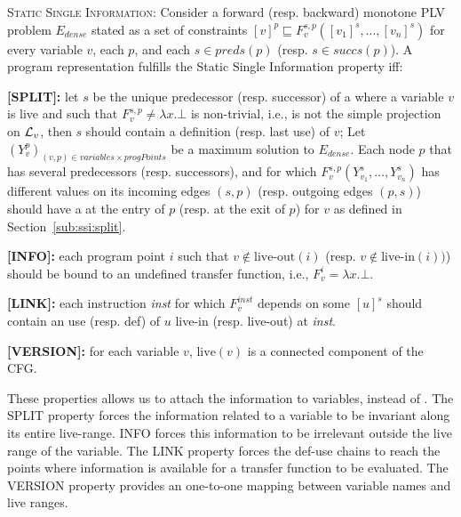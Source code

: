 \begin{property}[SSI]
\label{pro:ssi}\textsc{Static Single Information:} Consider a forward (resp. backward) monotone PLV problem $E_\textit{dense}$ stated as a set of constraints $[v]^p \sqsubseteq F_v^{s,p}([v_1]^s,\dots,[v_n]^s)$ for every variable $v$, each \progpoint $p$, and each $s \in \textit{preds}(p)$ (resp. $s\in \textit{succs}(p)$).
A program representation fulfills the Static Single Information property iff:\begin{description}
\item {\bf [SPLIT]:} let $s$ be the unique predecessor (resp. successor) of a \progpoint where a variable $v$ is live and such that $F_v^{s,p}\neq \lambda x.\bot$ is non-trivial, i.e., is not the simple projection on ${\cal L}_v$, then $s$ should contain a definition (resp. last use) of $v$; 
Let $(Y_v^p)_{(v,p)\in \textit{variables}\times \textit{progPoints}}$ be a maximum solution to $E_\textit{dense}$. 
Each node $p$ that has several predecessors (resp. successors), and for which $F_v^{s,p}(Y_{v_1}^s,\dots,Y_{v_n}^s)$ has different values on its incoming edges $(s,p)$ (resp. outgoing edges $(p,s)$) should have a \phifun at the entry of $p$ (resp. \sigmafun at the exit of $p$) for $v$
as defined in Section~\ref{sub:ssi:split}.
\item {\bf [INFO]:} each program point $i$ such that $v\not\in \textrm{live-out}(i)$ (resp. $v\not\in \textrm{live-in}(i))$)  should be bound to an undefined  transfer function, i.e., $F_v^i=\lambda x.\bot$.
\item {\bf [LINK]:} each instruction \textit{inst} for which $F_v^{\textit{inst}}$ depends on some $[u]^s$ should contain an use (resp. def) of $u$ live-in (resp. live-out) at
\textit{inst}.
\item {\bf [VERSION]:} for each variable $v$, $\textrm{live}(v)$ is a connected component of the CFG.
\end{description}
\end{property}

These properties allows us to attach the information to variables, instead of \progpoints.
The {SPLIT} property forces the information related to a variable to be invariant along its entire live-range.
{INFO} forces this information to be irrelevant outside the live range of the variable.
The {LINK} property forces the def-use chains to reach the points where information is available for a transfer function to be evaluated.
The {VERSION} property provides an one-to-one mapping between variable names and live ranges.

